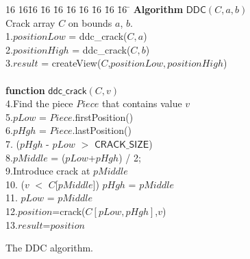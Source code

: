 \begin{figure}[t]
\begin{minipage}{4in}
{\small
\begin{tabbing}
16 16\= 16 \= 16 \= 16 \= 16 \= 16 \= 16 \= 16 \= 16 \= \kill
{\bf Algorithm} $\mathsf{DDC}(C,a,b)$\\
Crack array $C$ on bounds $a$, $b$.\\
1.\>$positionLow$  = ddc\_crack($C,a$)\\
2.\>$positionHigh$ = ddc\_crack($C,b$)\\
3.\>$result$ = createView($C$,$positionLow, positionHigh$)\\
\\
{\bf function} $\mathsf{ddc\_crack}(C,v)$\\
4.\>Find the piece $Piece$ that contains value $v$\\
5.\>$pLow$ = $Piece$.firstPosition()\\
6.\>$pHgh$ = $Piece$.lastPosition()\\
7. ($pHgh$ - $pLow$ $>$ $\mathsf{CRACK\_SIZE}$)\\
8.\>\>$pMiddle$ = ($pLow$+$pHgh$) / 2;    \\
9.\>\>Introduce crack at $pMiddle$\\
10.\> ($v$ $<$ $C$[$pMiddle$]) $pHgh$ = $pMiddle$\\
11.\> $pLow$ = $pMiddle$\\
12.\>$position$=crack($C[pLow,pHgh]$,$v$)\\
13.\>$result$=$position$\\
\end{tabbing}
}
\end{minipage}
\vspace{-2em}
\caption{The {DDC} algorithm.}\label{fig:ddc}
\vspace{-2.5em}
\end{figure}

